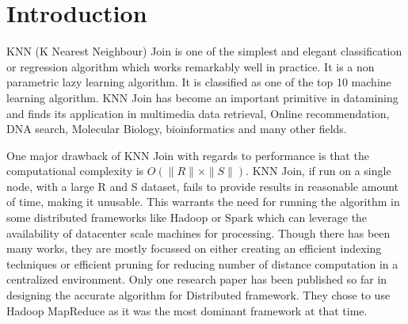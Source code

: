 \documentclass[conference]{IEEEtran}
\begin{document}






%
\IEEEpeerreviewmaketitle



\section{Introduction}

KNN (K Nearest Neighbour) Join is one of the simplest and elegant
classification or regression algorithm which works remarkably well in
practice. It is a non parametric lazy learning algorithm. It is
classified as one of the top 10 machine learning algorithm. KNN Join
has become an important primitive in datamining and
finds its application in multimedia data retrieval, Online
recommendation, DNA search,
Molecular Biology, bioinformatics  and
many other fields.

\medskip

One major drawback of KNN Join with regards to performance is that the computational complexity is
$O(\|R\| \times \|S\|)$. KNN Join, if run on a single node, with a
large R and S dataset, fails to provide results in reasonable amount of time, making it
unusable. This warrants the need for running the algorithm in some
distributed frameworks like Hadoop \cite{_hadoop_mr} or Spark \cite{_apache_spark} which can leverage the
availability of datacenter scale machines for processing.
Though there has been many works, they are mostly focussed on either creating
an efficient indexing techniques or efficient pruning for reducing
number of distance computation in a centralized environment.
Only one
research paper \cite{lu_efficient_2012} has been published so far in
designing the accurate algorithm
for Distributed framework. They chose to use Hadoop MapReduce as it
was the most dominant framework at that time.
\end{document}
